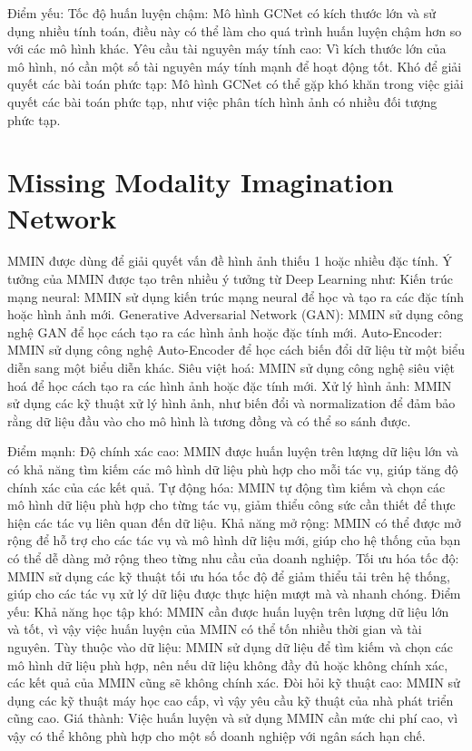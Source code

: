 Điểm yếu:
Tốc độ huấn luyện chậm: Mô hình GCNet có kích thước lớn và sử dụng nhiều tính toán, điều này có thể làm cho quá trình huấn luyện chậm hơn so với các mô hình khác.
Yêu cầu tài nguyên máy tính cao: Vì kích thước lớn của mô hình, nó cần một số tài nguyên máy tính mạnh để hoạt động tốt.
Khó để giải quyết các bài toán phức tạp: Mô hình GCNet có thể gặp khó khăn trong việc giải quyết các bài toán phức tạp, như việc phân tích hình ảnh có nhiều đối tượng phức tạp.

\section{Missing Modality Imagination Network}
\label{sec:Missing Modality Imagination Network}


MMIN được dùng để giải quyết vấn đề hình ảnh thiếu 1 hoặc nhiều đặc tính.
Ý tưởng của MMIN được tạo trên nhiều ý tưởng từ Deep Learning như:
Kiến trúc mạng neural: MMIN sử dụng kiến trúc mạng neural để học và tạo ra các đặc tính hoặc hình ảnh mới.
Generative Adversarial Network (GAN): MMIN sử dụng công nghệ GAN để học cách tạo ra các hình ảnh hoặc đặc tính mới.
Auto-Encoder: MMIN sử dụng công nghệ Auto-Encoder để học cách biến đổi dữ liệu từ một biểu diễn sang một biểu diễn khác.
Siêu việt hoá: MMIN sử dụng công nghệ siêu việt hoá để học cách tạo ra các hình ảnh hoặc đặc tính mới.
Xử lý hình ảnh: MMIN sử dụng các kỹ thuật xử lý hình ảnh, như biến đổi và normalization để đảm bảo rằng dữ liệu đầu vào cho mô hình là tương đồng và có thể so sánh được.

Điểm mạnh:
Độ chính xác cao: MMIN được huấn luyện trên lượng dữ liệu lớn và có khả năng tìm kiếm các mô hình dữ liệu phù hợp cho mỗi tác vụ, giúp tăng độ chính xác của các kết quả.
Tự động hóa: MMIN tự động tìm kiếm và chọn các mô hình dữ liệu phù hợp cho từng tác vụ, giảm thiểu công sức cần thiết để thực hiện các tác vụ liên quan đến dữ liệu.
Khả năng mở rộng: MMIN có thể được mở rộng để hỗ trợ cho các tác vụ và mô hình dữ liệu mới, giúp cho hệ thống của bạn có thể dễ dàng mở rộng theo từng nhu cầu của doanh nghiệp.
Tối ưu hóa tốc độ: MMIN sử dụng các kỹ thuật tối ưu hóa tốc độ để giảm thiểu tải trên hệ thống, giúp cho các tác vụ xử lý dữ liệu được thực hiện mượt mà và nhanh chóng.
Điểm yếu:
Khả năng học tập khó: MMIN cần được huấn luyện trên lượng dữ liệu lớn và tốt, vì vậy việc huấn luyện của MMIN có thể tốn nhiều thời gian và tài nguyên.
Tùy thuộc vào dữ liệu: MMIN sử dụng dữ liệu để tìm kiếm và chọn các mô hình dữ liệu phù hợp, nên nếu dữ liệu không đầy đủ hoặc không chính xác, các kết quả của MMIN cũng sẽ không chính xác.
Đòi hỏi kỹ thuật cao: MMIN sử dụng các kỹ thuật máy học cao cấp, vì vậy yêu cầu kỹ thuật của nhà phát triển cũng cao.
Giá thành: Việc huấn luyện và sử dụng MMIN cần mức chi phí cao, vì vậy có thể không phù hợp cho một số doanh nghiệp với ngân sách hạn chế.

